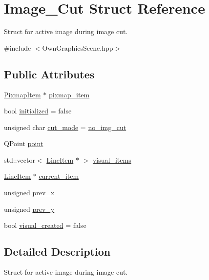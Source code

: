 \hypertarget{structImage__Cut}{}\section{Image\+\_\+\+Cut Struct Reference}
\label{structImage__Cut}


Struct for active image during image cut.  




{\ttfamily \#include $<$Own\+Graphics\+Scene.\+hpp$>$}

\subsection*{Public Attributes}
\begin{DoxyCompactItemize}
\item 
\mbox{\hyperlink{classPixmapItem}{Pixmap\+Item}} $\ast$ \mbox{\hyperlink{structImage__Cut_afdafc46c968b35b63758d409ef863a8f}{pixmap\+\_\+item}}
\item 
bool \mbox{\hyperlink{structImage__Cut_a7259136300a6eade3ee84743f3e47c1f}{initialized}} = false
\item 
unsigned char \mbox{\hyperlink{structImage__Cut_ad4904a8753086961301a91050f6b2794}{cut\+\_\+mode}} = \mbox{\hyperlink{OwnGraphicsScene_8hpp_a749db80b860523fda0b90a1c2afa5067}{no\+\_\+img\+\_\+cut}}
\item 
Q\+Point \mbox{\hyperlink{structImage__Cut_a45fc996285a5ae8ef255d66655d63df2}{point}}
\item 
std\+::vector$<$ \mbox{\hyperlink{classLineItem}{Line\+Item}} $\ast$ $>$ \mbox{\hyperlink{structImage__Cut_ad56f1d72a3d7c5488fec27eaf5c6fbd9}{visual\+\_\+items}}
\item 
\mbox{\hyperlink{classLineItem}{Line\+Item}} $\ast$ \mbox{\hyperlink{structImage__Cut_aa3fcac1ab311c38947b343d8913fb2e8}{current\+\_\+item}}
\item 
unsigned \mbox{\hyperlink{structImage__Cut_a9e6768e7bea9a60876d086d78da3c4df}{prev\+\_\+x}}
\item 
unsigned \mbox{\hyperlink{structImage__Cut_ad86dabb21b97270448d8db5aa7a5676f}{prev\+\_\+y}}
\item 
bool \mbox{\hyperlink{structImage__Cut_acbae7507f135d85e9f2f9724fbc2a643}{visual\+\_\+created}} = false
\end{DoxyCompactItemize}


\subsection{Detailed Description}
Struct for active image during image cut. 

